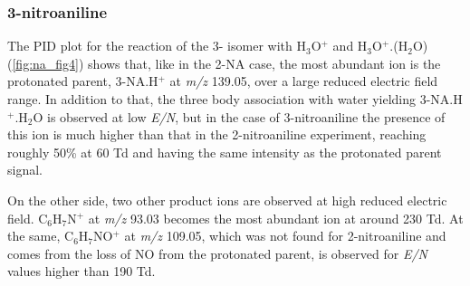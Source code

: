 \subsubsection{3-nitroaniline}
The PID plot for the reaction of the 3- isomer with H$_3$O$^+$ and H$_3$O$^+$.(H$_2$O) (\autoref{fig:na_fig4}) shows that, like in the 2-NA case, the most abundant ion is the protonated parent, 3-NA.H$^+$ at \textit{m/z} 139.05, over a large reduced electric field range.
In addition to that, the three body association with water yielding 3-NA.H$^+$.H$_2$O is observed at low \textit{E/N}, but in the case of 3-nitroaniline the presence of this ion is much higher than that in the 2-nitroaniline experiment, reaching roughly 50\% at 60 Td and having the same intensity as the protonated parent signal.

On the other side, two other product ions are observed at high reduced electric field.
C$_6$H$_7$N$^+$ at \textit{m/z} 93.03 becomes the most abundant ion at around 230 Td.
At the same, C$_6$H$_7$NO$^+$ at \textit{m/z} 109.05, which was not found for 2-nitroaniline and comes from the loss of NO from the protonated parent, is observed for \textit{E/N} values higher than 190 Td.



